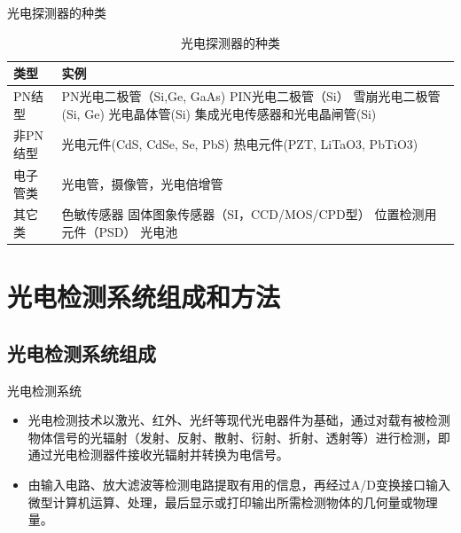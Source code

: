 \documentclass[10pt]{beamer}
\begin{document}
\begin{frame}[fragile]{光电探测器的种类}
 \begin{table}[]

 \caption{光电探测器的种类}
\label{table:1}
  \begin{center}
\begin{tabular}{ | m{1.8cm}| m{6.2cm} | } 
\hline
类型& 实例 \\ 
\hline
PN结型 & PN光电二极管（Si,Ge, GaAs)
\newline PIN光电二极管（Si）
\newline 雪崩光电二极管(Si, Ge)
\newline 光电晶体管(Si)
\newline 集成光电传感器和光电晶闸管(Si)
 \\ 
\hline
非PN结型 & 光电元件(CdS, CdSe, Se, PbS)
\newline 热电元件(PZT, LiTaO3, PbTiO3)
 \\ 
\hline
电子管类 & 光电管，摄像管，光电倍增管 \\
\hline
其它类 & 色敏传感器
\newline 固体图象传感器（SI，CCD/MOS/CPD型）
\newline 位置检测用元件（PSD）
\newline 光电池 \\
\hline
\end{tabular}
\end{center}
     
 \end{table}
\end{frame}

\section{光电检测系统组成和方法}
\subsection{光电检测系统组成}
\begin{frame}{光电检测系统}
    \begin{itemize}
        \item 光电检测技术以激光、红外、光纤等现代光电器件为基础，通过对载有被检测物体信号的光辐射（发射、反射、散射、衍射、折射、透射等）进行检测，即通过光电检测器件接收光辐射并转换为电信号。
        \item 由输入电路、放大滤波等检测电路提取有用的信息，再经过A/D变换接口输入微型计算机运算、处理，最后显示或打印输出所需检测物体的几何量或物理量。

    \end{itemize}


\end{frame}
\end{document}
